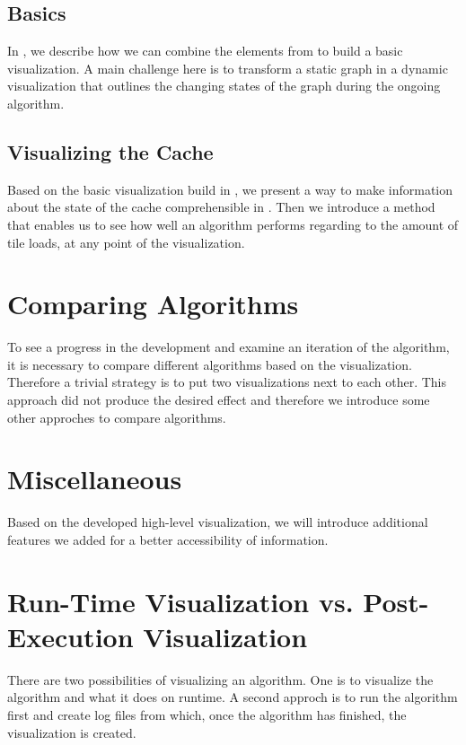 \documentclass
[
    paper = a4,
    pagesize,
    12 pt,
    oneside,                       %
    open = right,
    DIV = calc,
    BCOR = 0 mm,                   %
    bibtotoc
]
{scrbook}
\begin{document}
\subsection{Basics}

In , we describe how we can combine the elements from  to build a basic visualization.
A main challenge here is to transform a static graph in a dynamic visualization that outlines the changing states of the graph during the ongoing algorithm.


\subsection{Visualizing the Cache} \label{pre_cache}

Based on the basic visualization build in , we present a way to make information about the state of the cache comprehensible in .
Then we introduce a method that enables us to see how well an algorithm performs regarding to the amount of tile loads, at any point of the visualization.


\section{Comparing Algorithms}

To see a progress in the development and examine an iteration of the algorithm, it is necessary to compare different algorithms based on the visualization.
Therefore a trivial strategy is to put two visualizations next to each other.
This approach did not produce the desired effect and therefore we introduce some other approches to compare algorithms.


\section{Miscellaneous}

Based on the developed high-level visualization, we will introduce additional features we added for a better accessibility of information.


\section{Run-Time Visualization vs. Post-Execution Visualization}

There are two possibilities of visualizing an algorithm.
One is to visualize the algorithm and what it does on runtime.
A second approch is to run the algorithm first and create log files from which, once the algorithm has finished, the visualization is created.
\end{document}
